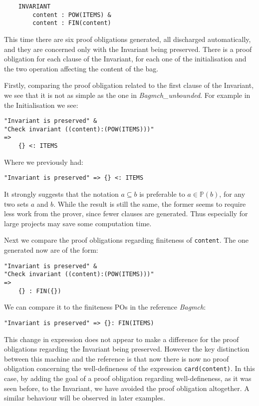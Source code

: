 \documentclass[11pt,journal]{IEEEtran}
\begin{document}
	\begin{lstlisting}
	INVARIANT
	    content : POW(ITEMS) & 
		content : FIN(content) 
	\end{lstlisting}
	
	This time there are six proof obligations generated, all discharged automatically, and they are concerned only with the Invariant being preserved. There is a proof obligation for each clause of the Invariant, for each one of the initialisation and the two operation affecting the content of the bag. 
	
	Firstly, comparing the proof obligation related to the first clause of the Invariant, we see that it is not as simple as the one in \emph{Bagmch\_unbounded}. For example in the Initialisation we see:
	
	\begin{lstlisting}
"Invariant is preserved" &
"Check invariant ((content):(POW(ITEMS)))" 
=>
	{} <: ITEMS 
	\end{lstlisting}

	Where we previously had:
	\begin{lstlisting}
"Invariant is preserved" => {} <: ITEMS 
	\end{lstlisting}
	
	It strongly suggests that the notation $a \subseteq b$ is preferable to $a \in \mathbb{P}(b)$, for any two sets $a$ and $b$. While the result is still the same, the former seems to require less work from the prover, since fewer clauses are generated. Thus especially for large projects may save some computation time. 
	
	Next we compare the proof obligations regarding finiteness of \texttt{content}. The one generated now are of the form:
	
	\begin{lstlisting}
"Invariant is preserved" &
"Check invariant ((content):(POW(ITEMS)))" 
=>
	{} : FIN({}) 
	\end{lstlisting}
	
	We can compare it to the finiteness POs in the reference \emph{Bagmch}:
	
	\begin{lstlisting}
"Invariant is preserved" => {}: FIN(ITEMS)  
	\end{lstlisting}
	
	This change in expression does not appear to make a difference for the proof obligations regarding the Invariant being preserved. However the key distinction between this machine and the reference is that now there is now no proof obligation concerning the well-defineness of the expression \texttt{card(content)}. In this case, by adding the goal of a proof obligation regarding well-defineness, as it was seen before, to the Invariant, we have avoided the proof obligation altogether. A similar behaviour will be observed in later examples.
	
\end{document}
